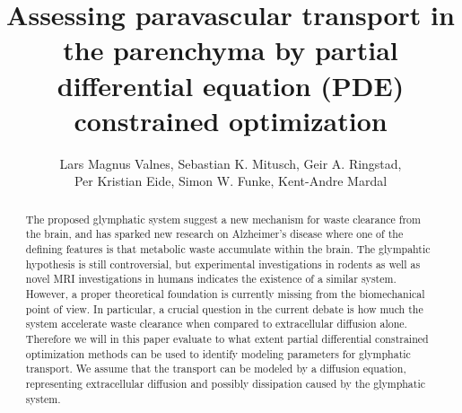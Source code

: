 \documentclass[11pt,a4paper]{article}
\title{Assessing paravascular transport in the parenchyma by partial differential equation (PDE) constrained optimization}
\author{Lars Magnus Valnes, Sebastian K. Mitusch, Geir A. Ringstad, \\ 
Per Kristian Eide, Simon W. Funke, Kent-Andre Mardal }
\begin{document}
\maketitle

\begin{abstract}
The proposed glymphatic system suggest a new mechanism for waste clearance from the brain, and has sparked new research on Alzheimer's disease where one of the defining features
is that metabolic waste accumulate within the brain. The glympahtic hypothesis is still controversial, but experimental investigations in rodents as well as novel MRI investigations in humans indicates the existence of a similar system. However, a proper theoretical foundation is currently missing from the biomechanical point of view.
In particular, a crucial question in the current debate is how much the system accelerate
waste clearance when compared to extracellular diffusion alone. Therefore
we will in this paper evaluate to what extent partial differential constrained optimization methods can be used to identify modeling parameters for glymphatic transport. We assume that the transport can be modeled by a diffusion equation, representing extracellular diffusion and possibly dissipation caused by the glymphatic system.

\end{abstract}
\end{document}
